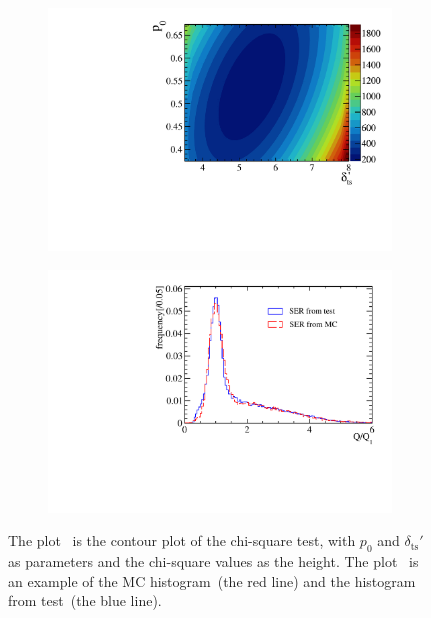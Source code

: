 \begin{figure}[!htbp]
	\centering
	\begin{subfigure}{0.47\textwidth}
		\centering
		\includegraphics[width=\linewidth]{PMTRelated/GTmodel/cour.pdf}
		\caption{}
		\label{fig:cour}
	\end{subfigure}
	\hfill
	\begin{subfigure}{0.47\textwidth}
		\centering
		\includegraphics[width=\linewidth]{PMTRelated/GTmodel/hist.pdf}
		\caption{}
		\label{fig:hist}
	\end{subfigure}
	\caption{The plot~ is the contour plot of the chi-square test, with $p_0$ and $\delta_{\mathrm{ts}}'$ as parameters
		and the chi-square values as the height.
		The plot~ is an example of the MC histogram~(the red line) and the histogram from test~(the blue line).
	}
	\label{fig:chi}
\end{figure}

